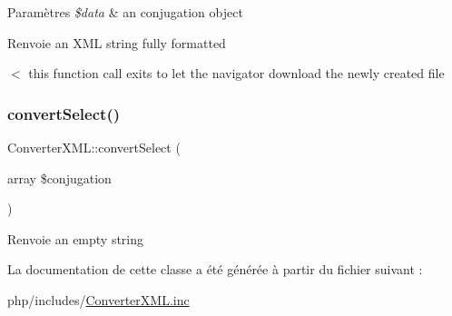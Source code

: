 \begin{DoxyParams}{Paramètres}
{\em \$data} & an conjugation object \\
\hline
\end{DoxyParams}
\begin{DoxyReturn}{Renvoie}
an X\+ML string fully formatted 
\end{DoxyReturn}
$<$ this function call exits to let the navigator download the newly created file \hypertarget{class_converter_x_m_l_a68b03941080baea355f4d9c71743343e}{}\label{class_converter_x_m_l_a68b03941080baea355f4d9c71743343e} 
\subsubsection{\texorpdfstring{convert\+Select()}{convertSelect()}}
{\footnotesize\ttfamily Converter\+X\+M\+L\+::convert\+Select (\begin{DoxyParamCaption}\item[{array}]{\$conjugation }\end{DoxyParamCaption})}

\begin{DoxyReturn}{Renvoie}
an empty string 
\end{DoxyReturn}


La documentation de cette classe a été générée à partir du fichier suivant \+:\begin{DoxyCompactItemize}
\item 
php/includes/\hyperlink{_converter_x_m_l_8inc}{Converter\+X\+M\+L.\+inc}\end{DoxyCompactItemize}
